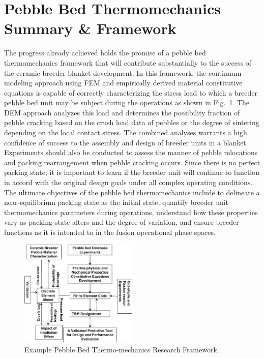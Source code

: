 \section{Pebble Bed Thermomechanics Summary \& Framework}
The progress already achieved holds the promise of a pebble bed thermomechanics framework that will contribute substantially to the success of the ceramic breeder blanket development. In this framework, the continuum modeling approach using FEM and empirically derived material constitutive equations is capable of correctly characterizing the stress load to which a breeder pebble bed unit may be subject during the operations as shown in Fig.~\ref{fig:framework}. The DEM approach analyzes this load and determines the possibility fraction of pebble cracking based on the crush load data of pebbles or the degree of sintering depending on the local contact stress. The combined analyses warrants a high confidence of success to the assembly and design of breeder units in a blanket.  Experiments should also be conducted to assess the manner of pebble relocations and packing rearrangement when pebble cracking occurs. Since there is no perfect packing state, it is important to learn if the breeder unit will continue to function in accord with the original design goals under all complex operating conditions.  The ultimate objectives of the pebble bed thermomechanics include to delineate a  near-equilibrium packing state as the initial state, quantify breeder unit thermomechanics parameters during operations, understand how these properties vary as packing state alters and the degree of variation, and ensure breeder functions as it is intended to in the fusion operational phase spaces.
\begin{figure}[t!]
\begin{center}
\includegraphics[width=0.5\textwidth]{chapters/figures/Fig-11}
\caption{Example Pebble Bed Thermo-mechanics Research Framework.}
\label{fig:framework}
\end{center}
\end{figure}

